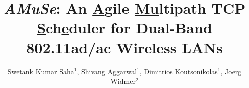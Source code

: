 \documentclass[10pt,sigconf]{acmart}
\begin{document}
\fancyhead{}
\newcommand{\name}{\emph{AMuSe}\xspace}

\title{\name: An \underline{A}gile \underline{Mu}ltipath TCP \underline{S}ch\underline{e}duler for Dual-Band 802.11ad/ac Wireless LANs}

\author{Swetank Kumar Saha$^1$, Shivang Aggarwal$^1$, Dimitrios Koutsonikolas$^1$, Joerg Widmer$^2$}

\begin{comment}
\author{Lars Th{\o}rv{\"a}ld}
\authornote{This author is the
  one who did all the really hard work.}
\affiliation{%
  \institution{The Th{\o}rv{\"a}ld Group}
  \streetaddress{1 Th{\o}rv{\"a}ld Circle}
  \city{Hekla}
  \country{Iceland}}
\email{larst@affiliation.org}

\author{Valerie B\'eranger}
\affiliation{%
  \institution{Inria Paris-Rocquencourt}
  \city{Rocquencourt}
  \country{France}
}
\author{Aparna Patel}
\affiliation{%
 \institution{Rajiv Gandhi University}
 \streetaddress{Rono-Hills}
 \city{Doimukh}
 \state{Arunachal Pradesh}
 \country{India}}
\author{Huifen Chan}
\affiliation{%
  \institution{Tsinghua University}
  \streetaddress{30 Shuangqing Rd}
  \city{Haidian Qu}
  \state{Beijing Shi}
  \country{China}
}

\author{Charles Palmer}
\affiliation{%
  \institution{Palmer Research Laboratories}
  \streetaddress{8600 Datapoint Drive}
  \city{San Antonio}
  \state{Texas}
  \postcode{78229}}
\email{cpalmer@prl.com}

\author{John Smith}
\affiliation{\institution{The Th{\o}rv{\"a}ld Group}}
\email{jsmith@affiliation.org}

\author{Julius P.~Kumquat}
\affiliation{\institution{The Kumquat Consortium}}
\email{jpkumquat@consortium.net}
\end{comment}
\end{document}
